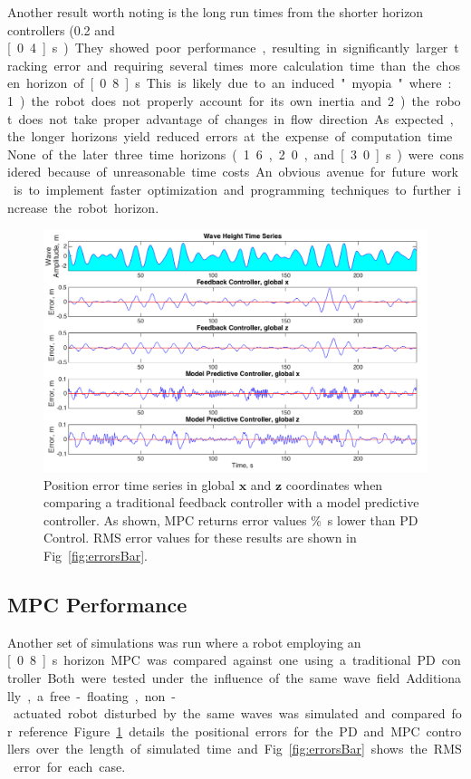 \documentclass[letterpaper, 10 pt, conferences]{IEEEconf}  %
\renewcommand{\vec}[1]{\mathbf{#1}}
\begin{document}
Another result worth noting is the long run times from the shorter horizon controllers (0.2 and \unit[0.4]{s}). They showed poor performance, resulting in significantly larger tracking error and requiring several times more calculation time than the chosen horizon of \unit[0.8]{s}. This is likely due to an induced "myopia" where: 1) the robot does not properly account for its own inertia and 2) the robot does not take proper advantage of changes in flow direction. 

As expected, the longer horizons yield reduced errors at the expense of computation time. None of the later three time horizons (1.6, 2.0, and \unit[3.0]{s}) were considered because of unreasonable time costs. An obvious avenue for future work is to implement faster optimization and programming techniques to further increase the robot horizon.

\begin{figure}
\includegraphics[width=1\linewidth]{images/compFig}
\centering
\caption{Position error time series in global $\vec{x}$ and $\vec{z}$ coordinates when comparing a traditional feedback controller with a model predictive controller. As shown, MPC returns error values \unit[74]{\%s} lower than PD Control. RMS error values for these results are shown in Fig~\ref{fig:errorsBar}.} 
\label{fig:errorComp}
\end{figure}

\subsection{MPC Performance} \label{results:perform}

Another set of simulations was run where a robot employing an \unit[0.8]{s} horizon MPC was compared against one using a traditional PD controller. Both were tested under the influence of the same wave field. Additionally, a free-floating, non-actuated robot disturbed by the same waves was simulated and compared for reference. Figure~\ref{fig:errorComp} details the positional errors for the PD and MPC controllers over the length of simulated time and Fig.~\ref{fig:errorsBar} shows the RMS error for each case.
\end{document}
